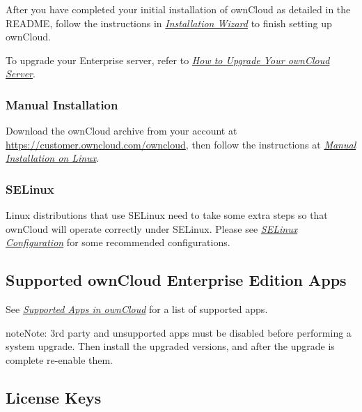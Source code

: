 \documentclass[letterpaper,10pt,english]{sphinxmanual}
\begin{document}
After you have completed your initial installation of ownCloud as detailed in
the README, follow the instructions in
{\hyperref[installation/installation_wizard::doc]{\emph{\emph{Installation Wizard}}}} to finish setting up ownCloud.

To upgrade your Enterprise server, refer to
{\hyperref[maintenance/upgrade::doc]{\emph{\emph{How to Upgrade Your ownCloud Server}}}}.


\subsubsection{Manual Installation}
\label{enterprise_installation/linux_installation:manual-installation}
Download the ownCloud archive from your account at \href{https://customer.owncloud.com/owncloud}{https://customer.owncloud.com/owncloud}, then follow the instructions at {\hyperref[installation/source_installation::doc]{\emph{\emph{Manual Installation on Linux}}}}.


\subsubsection{SELinux}
\label{enterprise_installation/linux_installation:selinux}
Linux distributions that use SELinux need to take some extra steps so that
ownCloud will operate correctly under SELinux. Please see
{\hyperref[installation/selinux_configuration::doc]{\emph{\emph{SELinux Configuration}}}} for some recommended configurations.


\subsection{Supported ownCloud Enterprise Edition Apps}
\label{enterprise_installation/supported_apps_installation:supported-owncloud-enterprise-edition-apps}\label{enterprise_installation/supported_apps_installation::doc}
See {\hyperref[installation/apps_supported::doc]{\emph{\emph{Supported Apps in ownCloud}}}} for a list of supported apps.

\begin{notice}{note}{Note:}
3rd party and unsupported apps must be disabled before performing a
system upgrade. Then install the upgraded versions, and after the
upgrade is complete re-enable them.
\end{notice}


\subsection{License Keys}
\label{enterprise_installation/license_keys_installation::doc}\label{enterprise_installation/license_keys_installation:license-keys}
\end{document}
